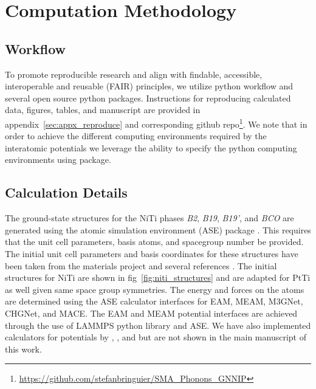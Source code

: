 \documentclass[preprint,colorlinks=true,linkcolor=black,citecolor=black]{elsarticle}
\begin{document}
\section{Computation Methodology}
\label{sec:methods}

\subsection{Workflow}
\label{sec:workflow}
To promote reproducible research and align with findable, accessible,
interoperable and reusable (FAIR) principles\cite{Walsh2024}, we
utilize \showyourwork python workflow\cite{Luger2021} and several open
source python packages. Instructions for reproducing calculated data,
figures, tables, and manuscript are provided in
appendix~\ref{sec:appx_reproduce} and corresponding github
repo\footnote{\url{https://github.com/stefanbringuier/SMA_Phonons_GNNIP}}. We
note that in order to achieve the different computing environments
required by the interatomic potentials we leverage the ability to
specify the python computing environments using
\href{https://github.com/showyourwork/showyourwork}{\showyourwork}
package.\par

\subsection{Calculation Details}
\label{sec:calc_details}
The ground-state structures for the NiTi phases \textit{B2},
\textit{B19}, \textit{B19'}, and \textit{BCO} are generated using the
atomic simulation environment (ASE) package \cite{Larsen2017}. This
requires that the unit cell parameters, basis atoms, and spacegroup
number be provided. The initial unit cell parameters and basis
coordinates for these structures have been taken from the materials
project \cite{Jain2013} and several references
\cite{Haskins2016,Kadkhodaei2018}. The initial structures for NiTi are
shown in fig~\ref{fig:niti_structures} and are adapted for PtTi as
well given same space group symmetries. The energy and forces on the
atoms are determined using the ASE calculator interfaces for EAM,
MEAM, M3GNet, CHGNet, and
MACE.\cite{Mutter2010,Zhong2011,Ko2015,Kim2017,Chen2022,Deng2023,Batatia2022}
The EAM and MEAM potential interfaces are achieved through the use of
LAMMPS python library \cite{Thompson2022} and ASE. We have also
implemented calculators for potentials by \cite{Kavousi2019},
\cite{Wang2018}, and \cite{Choudhary2021} but are not shown in the
main manuscript of this work.\par
\end{document}
